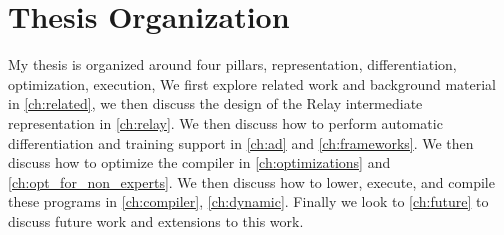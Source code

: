 \section{Thesis Organization}

My thesis is organized around four pillars, representation, differentiation, optimization, execution,
We first explore related work and background material
  in \ref{ch:related}, we then discuss the design of the Relay intermediate representation in \ref{ch:relay}.
We then discuss how to perform automatic differentiation and training support in \ref{ch:ad} and
  \ref{ch:frameworks}.
We then discuss how to optimize the compiler in \ref{ch:optimizations} and \ref{ch:opt_for_non_experts}.
We then discuss how to lower, execute, and compile these programs in
\ref{ch:compiler}, \ref{ch:dynamic}.
Finally we look to \ref{ch:future} to discuss future work and extensions to this work.




